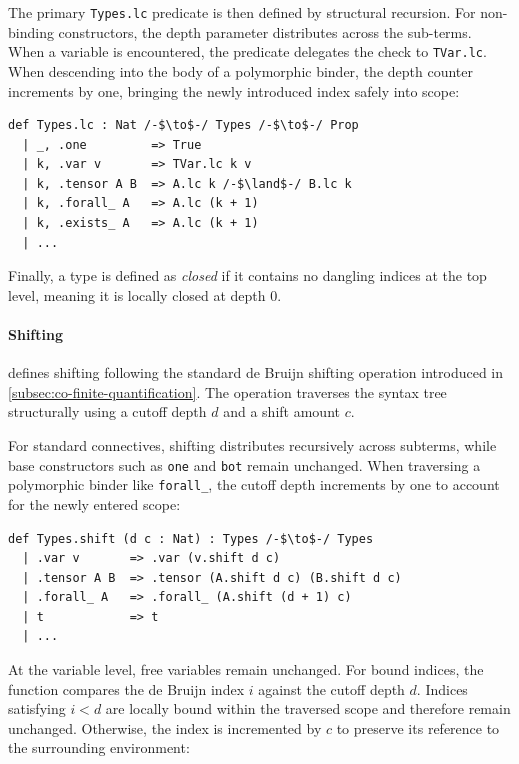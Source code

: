The primary \texttt{Types.lc} predicate is then defined by structural recursion. For non-binding constructors, the depth parameter distributes across the sub-terms. When a variable is encountered, the predicate delegates the check to \texttt{TVar.lc}. When descending into the body of a polymorphic binder, the depth counter increments by one, bringing the newly introduced index safely into scope:

\begin{lstlisting}[language=Lean4]
def Types.lc : Nat /-$\to$-/ Types /-$\to$-/ Prop
  | _, .one         => True
  | k, .var v       => TVar.lc k v
  | k, .tensor A B  => A.lc k /-$\land$-/ B.lc k
  | k, .forall_ A   => A.lc (k + 1)
  | k, .exists_ A   => A.lc (k + 1)
  | ...
\end{lstlisting}

Finally, a type is defined as \emph{closed} if it contains no dangling indices at the top level, meaning it is locally closed at depth $0$.

\paragraph{Shifting}  defines shifting following the standard de Bruijn shifting operation introduced in \cref{subsec:co-finite-quantification}. The operation traverses the syntax tree structurally using a cutoff depth $d$ and a shift amount $c$.

For standard connectives, shifting distributes recursively across subterms, while base constructors such as \texttt{one} and \texttt{bot} remain unchanged. When traversing a polymorphic binder like \texttt{forall\_}, the cutoff depth increments by one to account for the newly entered scope:

\begin{lstlisting}[language=Lean4]
def Types.shift (d c : Nat) : Types /-$\to$-/ Types
  | .var v       => .var (v.shift d c)
  | .tensor A B  => .tensor (A.shift d c) (B.shift d c)
  | .forall_ A   => .forall_ (A.shift (d + 1) c)
  | t            => t
  | ...
\end{lstlisting}

At the variable level, free variables remain unchanged. For bound indices, the function compares the de Bruijn index $i$ against the cutoff depth $d$. Indices satisfying $i < d$ are locally bound within the traversed scope and therefore remain unchanged. Otherwise, the index is incremented by $c$ to preserve its reference to the surrounding environment:

